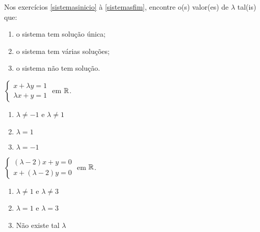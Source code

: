 \documentclass[12pt]{exam}
\begin{document}
Nos exercícios \ref{sistemasinicio} à \ref{sistemasfim}, encontre o(s) valor(es) de $\lambda$ tal(is) que:
\begin{enumerate}[label={\alph*})]
    \item o sistema tem solução única;

    \item o sistema tem várias soluções;

    \item o sistema não tem solução.
\end{enumerate}

\begin{exercicio}\label{sistemasinicio}
    $
        \begin{cases}
            x + \lambda y = 1\\
            \lambda x + y = 1
        \end{cases}
    $
    em $\mathbb{R}$.
    \begin{solucao}
        \begin{enumerate}[label={\alph*})]
            \item $\lambda \ne -1$ e $\lambda \ne 1$

            \item $\lambda = 1$

            \item $\lambda = -1$
        \end{enumerate}
    \end{solucao}
\end{exercicio}

\begin{exercicio}
    $
        \begin{cases}
            (\lambda - 2)x + y = 0\\
            x + (\lambda - 2)y = 0
        \end{cases}
    $
    em $\mathbb{R}$.
    \begin{solucao}
        \begin{enumerate}[label={\alph*})]
            \item $\lambda \ne 1$ e $\lambda \ne 3$

            \item $\lambda = 1$ e $\lambda = 3$

            \item Não existe tal $\lambda$
        \end{enumerate}
    \end{solucao}
\end{exercicio}
\end{document}
